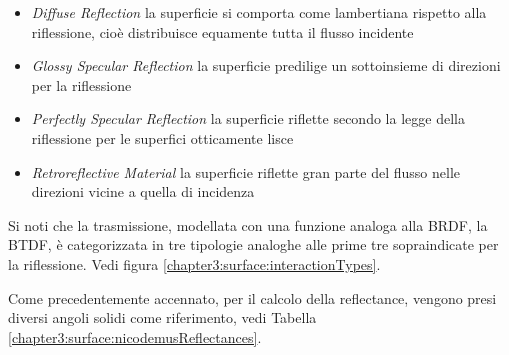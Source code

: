 \begin{itemize}[topsep=0pt, noitemsep]
	\item[] \textit{Diffuse Reflection} la superficie si comporta come lambertiana rispetto alla riflessione, cio\`e distribuisce equamente 
		tutta\footnotemark{} il flusso incidente
	\item[] \textit{Glossy Specular Reflection} la superficie predilige un sottoinsieme di direzioni per la riflessione
	\item[] \textit{Perfectly Specular Reflection} la superficie riflette secondo la legge della riflessione per le superfici otticamente lisce
	\item[] \textit{Retroreflective Material} la superficie riflette gran parte del flusso nelle direzioni vicine a quella di incidenza
\end{itemize}
Si noti che la trasmissione, modellata con una funzione analoga alla BRDF, la BTDF, \`e categorizzata in tre tipologie analoghe alle prime 
tre sopraindicate per la riflessione. Vedi figura \ref{chapter3:surface:interactionTypes}.\par
Come precedentemente accennato, per il calcolo della reflectance, vengono presi diversi angoli solidi come riferimento, vedi Tabella 
\ref{chapter3:surface:nicodemusReflectances}.
